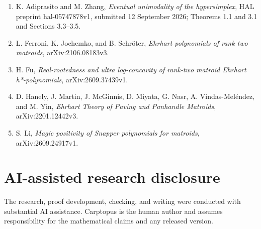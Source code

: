 \documentclass[10pt]{article}
\begin{document}
\begin{enumerate}
\item K. Adiprasito and M. Zhang, \emph{Eventual unimodality of the hypersimplex}, HAL preprint hal-05747878v1, submitted 12 September 2026; Theorems 1.1 and 3.1 and Sections 3.3--3.5.
\item L. Ferroni, K. Jochemko, and B. Schröter, \emph{Ehrhart polynomials of rank two matroids}, arXiv:2106.08183v3.
\item H. Fu, \emph{Real-rootedness and ultra log-concavity of rank-two matroid Ehrhart h*-polynomials}, arXiv:2609.37439v1.
\item D. Hanely, J. Martin, J. McGinnis, D. Miyata, G. Nasr, A. Vindas-Meléndez, and M. Yin, \emph{Ehrhart Theory of Paving and Panhandle Matroids}, arXiv:2201.12442v3.
\item S. Li, \emph{Magic positivity of Snapper polynomials for matroids}, arXiv:2609.24917v1.
\end{enumerate}

\section*{AI-assisted research disclosure}


The research, proof development, checking, and writing were conducted with
substantial AI assistance.  Carptopus is the human author and assumes
responsibility for the mathematical claims and any released version.
\end{document}
